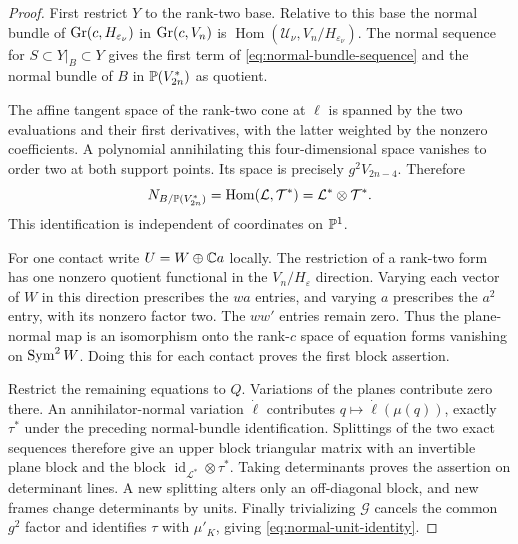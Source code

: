 \begin{proof}
First restrict $Y$ to the rank-two base. Relative to this base the
normal bundle of $\operatorname{Gr}(c,H_{\varepsilon_\nu})$ in $\operatorname{Gr}(c,V_n)$
is $\operatorname{Hom}(\mathcal U_\nu,V_n/H_{\varepsilon_\nu})$.
The normal sequence for $S\subset Y|_B\subset Y$ gives the first
term of \eqref{eq:normal-bundle-sequence} and the normal bundle of
$B$ in $\mathbb P(V_{2n}^*)$ as quotient.

The affine tangent space of the rank-two cone at $\ell$ is spanned
by the two evaluations and their first derivatives, with the latter
weighted by the nonzero coefficients. A polynomial annihilating this
four-dimensional space vanishes to order two at both support points.
Its space is precisely $g^2V_{2n-4}$. Therefore
\[
 N_{B/\mathbb P(V_{2n}^*)}
 =\operatorname{Hom}(\mathcal L,\mathcal T^*)
 =\mathcal L^*\otimes\mathcal T^*.
\]
This identification is independent of coordinates on $\mathbb P^1$.

For one contact write $U=W\oplus\mathbb C a$ locally. The restriction
of a rank-two form has one nonzero quotient functional in the
$V_n/H_\varepsilon$ direction. Varying each vector of $W$ in this
direction prescribes the $wa$ entries, and varying $a$ prescribes
the $a^2$ entry, with its nonzero factor two. The $ww'$ entries
remain zero. Thus the plane-normal map is an isomorphism onto the
rank-$c$ space of equation forms vanishing on $\operatorname{Sym}^2W$.
Doing this for each contact proves the first block assertion.

Restrict the remaining equations to $Q$. Variations of the planes
contribute zero there. An annihilator-normal variation $\dot\ell$
contributes $q\mapsto\dot\ell(\mu(q))$, exactly $\tau^*$ under
the preceding normal-bundle identification. Splittings of the two
exact sequences therefore give an upper block triangular matrix with
an invertible plane block and the block
$\operatorname{id}_{\mathcal L^*}\otimes\tau^*$. Taking determinants
proves the assertion on determinant lines. A new splitting alters
only an off-diagonal block, and new frames change determinants by
units. Finally trivializing $\mathcal G$ cancels the common $g^2$
factor and identifies $\tau$ with $\mu'_K$, giving
\eqref{eq:normal-unit-identity}.
\end{proof}


